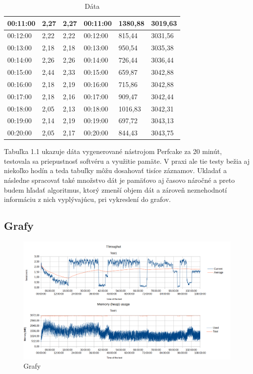 \begin{table}[htb]
\begin{tabular}{|l|l|l|l|l|l|}
00:11:00      & 2,27             & 2,27             & 00:11:00      & 1380,88       & 3019,63        \\ \hline
00:12:00      & 2,22             & 2,22             & 00:12:00      & 815,44        & 3031,56        \\ \hline
00:13:00      & 2,18             & 2,18             & 00:13:00      & 950,54        & 3035,38        \\ \hline
00:14:00      & 2,26             & 2,26             & 00:14:00      & 726,44        & 3036,44        \\ \hline
00:15:00      & 2,44             & 2,33             & 00:15:00      & 659,87        & 3042,88        \\ \hline
00:16:00      & 2,18             & 2,19             & 00:16:00      & 715,86        & 3042,88        \\ \hline
00:17:00      & 2,18             & 2,16             & 00:17:00      & 909,47        & 3042,44        \\ \hline
00:18:00      & 2,05             & 2,13             & 00:18:00      & 1016,83       & 3042,31        \\ \hline
00:19:00      & 2,14             & 2,19             & 00:19:00      & 697,72        & 3043,13        \\ \hline
00:20:00      & 2,05             & 2,17             & 00:20:00      & 844,43        & 3043,75        \\ \hline
\end{tabular}
\caption{Dáta}
\end{table}

Tabuľka 1.1 ukazuje dáta vygenerované nástrojom Perfcake za 20 minút, testovala sa priepustnosť softvéru a využitie pamäte. V praxi ale tie testy bežia aj niekoľko hodín a teda tabuľky môžu dosahovať tisíce záznamov. Ukladať a následne spracovať také množstvo dát je pamäťovo aj časovo náročné a preto budem hľadať algoritmus, ktorý zmenší objem dát a zároveň neznehodnotí informáciu z nich vyplývajúcu, pri vykreslení do grafov.

\subsection{Grafy}

\begin{figure}[!htb]
\includegraphics[scale=0.75, angle =90]{graphs.png}
\caption{Grafy}
\end{figure}

